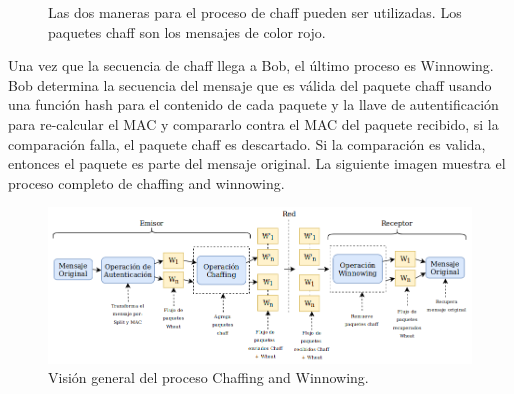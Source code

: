 \documentclass[12pt, a4paper, titlepage]{report}
\begin{document}
		\begin{figure}[H]
         \centering
         \caption[Formas del proceso de chaff]{Las dos maneras para el proceso de chaff pueden ser utilizadas. Los paquetes chaff son los mensajes de color rojo.}
         \label{f:Enfoques}
        \end{figure}
		Una vez que la secuencia de chaff llega a Bob, el último proceso es Winnowing. Bob determina la secuencia del mensaje que es válida del paquete chaff usando una función hash para el contenido de cada paquete y la llave de autentificación para re-calcular el MAC y compararlo contra el MAC del paquete recibido, si la comparación falla, el paquete chaff es descartado. Si la comparaci\'on es valida, entonces el paquete es parte del mensaje original. La siguiente imagen muestra el proceso completo de chaffing and winnowing.

		\begin{figure}[H]
			\begin{center}	                  \includegraphics[width=14cm]{./imagenes/MarcoTeorico/chaff_winn.png}
				\caption{Visión general del proceso Chaffing and Winnowing.}
			\end{center}
		\end{figure}
        
\end{document}
